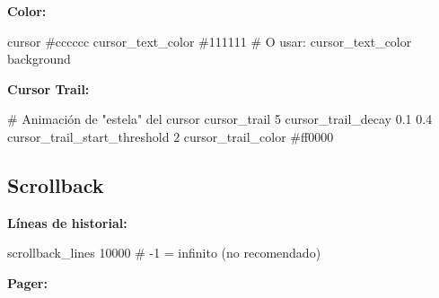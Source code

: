 \documentclass[
  doc,
  floatsintext,
  longtable,
  a4paper,
  nolmodern,
  notxfonts,
  notimes,
  12pt,
  colorlinks=true,linkcolor=blue,citecolor=blue,urlcolor=blue]{apa7}
\newenvironment{Shaded}{\begin{snugshade}}{\end{snugshade}}
\newcommand{\CommentTok}[1]{\textcolor[rgb]{0.37,0.37,0.37}{#1}}
\newcommand{\DataTypeTok}[1]{\textcolor[rgb]{0.68,0.00,0.00}{#1}}
\newcommand{\ErrorTok}[1]{\textcolor[rgb]{0.68,0.00,0.00}{#1}}
\begin{document}
\textbf{Color:}

\begin{Shaded}
\begin{Highlighting}[]
\DataTypeTok{cursor} \CommentTok{\#cccccc}
\DataTypeTok{cursor\_text\_color} \CommentTok{\#111111}
\CommentTok{\# O usar: cursor\_text\_color background}
\end{Highlighting}
\end{Shaded}

\textbf{Cursor Trail:}

\begin{Shaded}
\begin{Highlighting}[]
\CommentTok{\# Animación de "estela" del cursor}
\DataTypeTok{cursor\_trail} \DataTypeTok{5}
\DataTypeTok{cursor\_trail\_decay} \DataTypeTok{0.1} \DataTypeTok{0.4}
\DataTypeTok{cursor\_trail\_start\_threshold} \DataTypeTok{2}
\DataTypeTok{cursor\_trail\_color} \CommentTok{\#ff0000}
\end{Highlighting}
\end{Shaded}

\subsection{Scrollback}\label{scrollback}

\textbf{Líneas de historial:}

\begin{Shaded}
\begin{Highlighting}[]
\DataTypeTok{scrollback\_lines} \DataTypeTok{10000}
\CommentTok{\# {-}1 = infinito (no recomendado)}
\end{Highlighting}
\end{Shaded}

\textbf{Pager:}

\begin{Shaded}
\end{Shaded}
\end{document}
